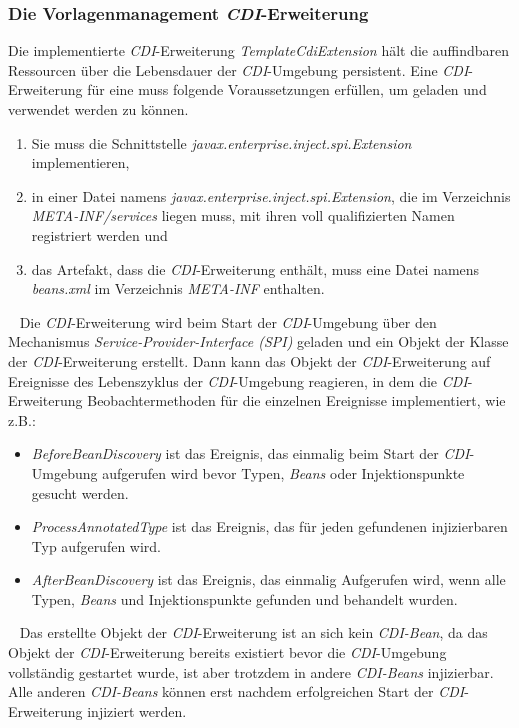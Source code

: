 \subsubsection{Die Vorlagenmanagement \emph{CDI}-Erweiterung}
Die implementierte \emph{CDI}-Erweiterung \emph{TemplateCdiExtension} hält die auffindbaren Ressourcen über die Lebensdauer der \emph{CDI}-Umgebung persistent. Eine \emph{CDI}-Erweiterung für eine muss folgende Voraussetzungen erfüllen, um geladen und verwendet werden zu können. 
\begin{enumerate}
	\item Sie muss die Schnittstelle \emph{javax.enterprise.inject.spi.Extension} implementieren,
	\item in einer Datei namens \emph{javax.enterprise.inject.spi.Extension}, die im Verzeichnis \emph{META-INF/services} liegen muss, mit ihren voll qualifizierten Namen registriert werden und
	\item das Artefakt, dass die \emph{CDI}-Erweiterung enthält, muss eine Datei namens \emph{beans.xml} im Verzeichnis \emph{META-INF} enthalten.
\end{enumerate}
\ \newline
Die \emph{CDI}-Erweiterung wird beim Start der \emph{CDI}-Umgebung über den Mechanismus \emph{Service-Provider-Interface (SPI)} geladen und ein Objekt der Klasse der \emph{CDI}-Erweiterung erstellt. Dann kann das Objekt der \emph{CDI}-Erweiterung auf Ereignisse des Lebenszyklus der \emph{CDI}-Umgebung reagieren, in dem die \emph{CDI}-Erweiterung Beobachtermethoden für die einzelnen Ereignisse implementiert, wie z.B.:
\begin{itemize}
	\item\emph{BeforeBeanDiscovery}
	\newline
	ist das Ereignis, das einmalig beim Start der \emph{CDI}-Umgebung aufgerufen wird bevor Typen, \emph{Beans} oder Injektionspunkte gesucht werden.
	\item\emph{ProcessAnnotatedType}
	\newline
	ist das Ereignis, das für jeden gefundenen injizierbaren Typ aufgerufen wird.
	\item\emph{AfterBeanDiscovery} 
	\newline
	ist das Ereignis, das einmalig Aufgerufen wird, wenn alle Typen, \emph{Beans} und Injektionspunkte gefunden und behandelt wurden.
\end{itemize}
\ \newline
Das erstellte Objekt der \emph{CDI}-Erweiterung ist an sich kein \emph{CDI-Bean}, da das Objekt der \emph{CDI}-Erweiterung bereits existiert bevor die \emph{CDI}-Umgebung vollständig gestartet wurde, ist aber trotzdem in andere \emph{CDI-Beans} injizierbar. Alle anderen \emph{CDI-Beans} können erst nachdem erfolgreichen Start der \emph{CDI}-Erweiterung injiziert werden.
